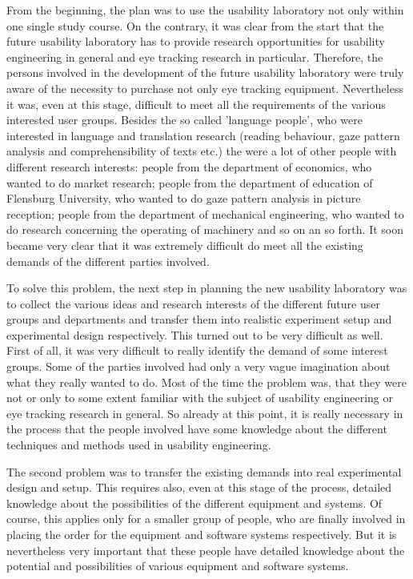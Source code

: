 \documentclass[output=paper]{langsci/langscibook}
\begin{document}
From the beginning, the plan was to use the usability laboratory not only within one single study course. On the contrary, it was clear from the start that the future usability laboratory has to provide research opportunities for usability engineering in general and eye tracking research in particular. Therefore, the persons involved in the development of the future usability laboratory were truly aware of the necessity to purchase not only eye tracking equipment. Nevertheless it was, even at this stage, difficult to meet all the requirements of the various interested user groups. Besides the so called 'language people', who were interested in language and translation research (reading behaviour, gaze pattern analysis and comprehensibility of texts etc.) the were a lot of other people with different research interests: people from the department of economics, who wanted to do market research; people from the department of education of Flensburg University, who wanted to do gaze pattern analysis in picture reception; people from the department of mechanical engineering, who wanted to do research concerning the operating of machinery and so on an so forth. It soon became very clear that it was extremely difficult do meet all the existing demands of the different parties involved.



To solve this problem, the next step in planning the new usability laboratory was to collect the various ideas and research interests of the different future user groups and departments and transfer them into realistic experiment setup and experimental design respectively. This turned out to be very difficult as well. First of all, it was very difficult to really identify the demand of some interest groups. Some of the parties involved had only a very vague imagination about what they really wanted to do. Most of the time the problem was, that they were not or only to some extent familiar with the subject of usability engineering or eye tracking research in general. So already at this point, it is really necessary in the process that the people involved have some knowledge about the different techniques and methods used in usability engineering. 



The second problem was to transfer the existing demands into real experimental design and setup. This requires also, even at this stage of the process, detailed knowledge about the possibilities of the different equipment and systems. Of course, this applies only for a smaller group of people, who are finally involved in placing the order for the equipment and software systems respectively. But it is nevertheless very important that these people have detailed knowledge about the potential and possibilities of various equipment and software systems. 
\end{document}
